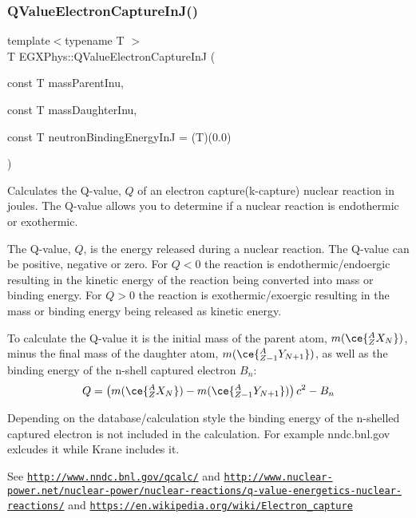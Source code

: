 \subsubsection{\texorpdfstring{Q\+Value\+Electron\+Capture\+In\+J()}{QValueElectronCaptureInJ()}}
{\footnotesize\ttfamily template$<$typename T $>$ \\
T E\+G\+X\+Phys\+::\+Q\+Value\+Electron\+Capture\+InJ (\begin{DoxyParamCaption}\item[{const T}]{mass\+Parent\+Inu,  }\item[{const T}]{mass\+Daughter\+Inu,  }\item[{const T}]{neutron\+Binding\+Energy\+InJ = {\ttfamily (T)(0.0)} }\end{DoxyParamCaption})}



Calculates the Q-\/value, $Q$ of an electron capture(k-\/capture) nuclear reaction in joules. The Q-\/value allows you to determine if a nuclear reaction is endothermic or exothermic. 

The Q-\/value, $Q$, is the energy released during a nuclear reaction. The Q-\/value can be positive, negative or zero. For $Q < 0$ the reaction is endothermic/endoergic resulting in the kinetic energy of the reaction being converted into mass or binding energy. For $Q > 0$ the reaction is exothermic/exoergic resulting in the mass or binding energy being released as kinetic energy.

To calculate the Q-\/value it is the initial mass of the parent atom, $m(\ce{ ^{A}_{Z}X_{N} })$, minus the final mass of the daughter atom, $m(\ce{ ^{A}_{Z-1}Y_{N +1} })$, as well as the binding energy of the n-\/shell captured electron $B_n$\+: \[Q = \left ( m(\ce{ ^{A}_{Z}X_{N} })-m(\ce{ ^{A}_{Z-1}Y_{N +1} }) \right) c^2-B_n\]

Depending on the database/calculation style the binding energy of the n-\/shelled captured electron is not included in the calculation. For example nndc.\+bnl.\+gov exlcudes it while Krane includes it.

See \href{http://www.nndc.bnl.gov/qcalc/}{\tt http\+://www.\+nndc.\+bnl.\+gov/qcalc/} and \href{http://www.nuclear-power.net/nuclear-power/nuclear-reactions/q-value-energetics-nuclear-reactions/}{\tt http\+://www.\+nuclear-\/power.\+net/nuclear-\/power/nuclear-\/reactions/q-\/value-\/energetics-\/nuclear-\/reactions/} and \href{https://en.wikipedia.org/wiki/Electron_capture}{\tt https\+://en.\+wikipedia.\+org/wiki/\+Electron\+\_\+capture}

